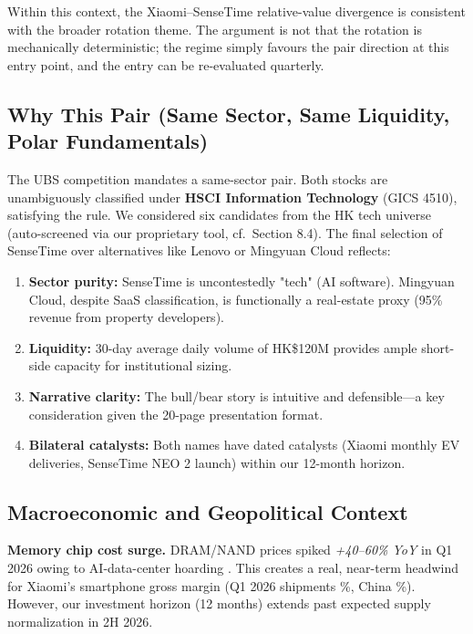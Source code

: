 \documentclass[11pt,a4paper]{article}
\begin{document}
Within this context, the Xiaomi--SenseTime relative-value divergence is consistent with the broader rotation theme. The argument is not that the rotation is mechanically deterministic; the regime simply favours the pair direction at this entry point, and the entry can be re-evaluated quarterly.

\subsection{Why This Pair (Same Sector, Same Liquidity, Polar Fundamentals)}

The UBS competition mandates a same-sector pair. Both stocks are unambiguously classified under \textbf{HSCI Information Technology} (GICS 4510), satisfying the rule. We considered six candidates from the HK tech universe (auto-screened via our proprietary tool, cf.\ Section 8.4). The final selection of SenseTime over alternatives like Lenovo or Mingyuan Cloud reflects:

\begin{enumerate}
\item \textbf{Sector purity:} SenseTime is uncontestedly "tech" (AI software). Mingyuan Cloud, despite SaaS classification, is functionally a real-estate proxy (95\% revenue from property developers).
\item \textbf{Liquidity:} 30-day average daily volume of HK\$120M provides ample short-side capacity for institutional sizing.
\item \textbf{Narrative clarity:} The bull/bear story is intuitive and defensible—a key consideration given the 20-page presentation format.
\item \textbf{Bilateral catalysts:} Both names have dated catalysts (Xiaomi monthly EV deliveries, SenseTime NEO 2 launch) within our 12-month horizon.
\end{enumerate}

\subsection{Macroeconomic and Geopolitical Context}

\textbf{Memory chip cost surge.}  DRAM/NAND prices spiked \textit{+40--60\% YoY} in Q1 2026 owing to AI-data-center hoarding \cite{counterpoint2026q1}. This creates a real, near-term headwind for Xiaomi's smartphone gross margin (Q1 2026 shipments \%, China \%). However, our investment horizon (12 months) extends past expected supply normalization in 2H 2026.
\end{document}
